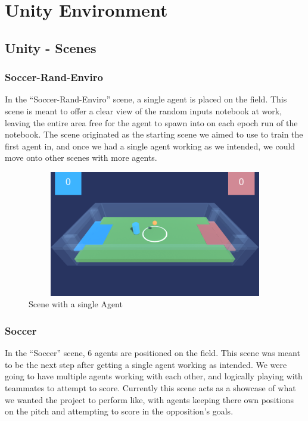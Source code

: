 \section{Unity Environment}

\subsection{Unity - Scenes}
\subsubsection{Soccer-Rand-Enviro}
In the “Soccer-Rand-Enviro” scene, a single agent is placed on the field. This scene is meant to offer a clear view of the random inputs notebook at work, leaving the entire area free for the agent to spawn into on each epoch run of the notebook. The scene originated as the starting scene we aimed to use to train the first agent in, and once we had a single agent working as we intended, we could move onto other scenes with more agents.

\begin{figure}[H]
    \centering
    \includegraphics[width=115mm, height=55mm]{img/GameScreen3.png}
    \caption{Scene with a single Agent}
    \label{fig:socran}
\end{figure}

\subsubsection{Soccer}
In the “Soccer” scene, 6 agents are positioned on the field. This scene was meant to be the next step after getting a single agent working as intended. We were going to have multiple agents working with each other, and logically playing with teammates to attempt to score. Currently this scene acts as a showcase of what we wanted the project to perform like, with agents keeping there own positions on the pitch and attempting to score in the opposition's goals.

